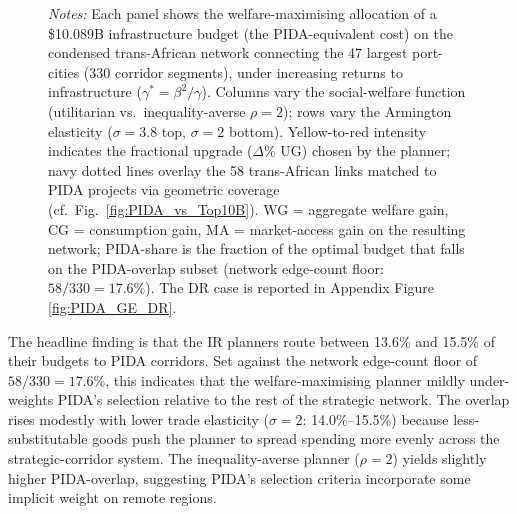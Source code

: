 \documentclass[a4paper]{article}
\begin{document}
\begin{figure}[h!]
\emph{Notes:} Each panel shows the welfare-maximising allocation of a \$10.089B infrastructure budget (the PIDA-equivalent cost) on the condensed trans-African network connecting the 47 largest port-cities (330 corridor segments), under increasing returns to infrastructure ($\gamma^\ast = \beta^2/\gamma$). Columns vary the social-welfare function (utilitarian vs.\ inequality-averse $\rho = 2$); rows vary the Armington elasticity ($\sigma = 3.8$ top, $\sigma = 2$ bottom). Yellow-to-red intensity indicates the fractional upgrade ($\Delta\%$ UG) chosen by the planner; navy dotted lines overlay the 58 trans-African links matched to PIDA projects via geometric coverage (cf.\ Fig.\ \ref{fig:PIDA_vs_Top10B}). WG = aggregate welfare gain, CG = consumption gain, MA = market-access gain on the resulting network; PIDA-share is the fraction of the optimal budget that falls on the PIDA-overlap subset (network edge-count floor: $58/330 = 17.6\%$). %
The DR case is reported in Appendix Figure \ref{fig:PIDA_GE_DR}. \vspace{-5mm}
\end{figure}

The headline finding is that the IR planners route between 13.6\% and 15.5\% of their budgets to PIDA corridors. Set against the network edge-count floor of $58/330 = 17.6\%$, this indicates that the welfare-maximising planner mildly under-weights PIDA's selection relative to the rest of the strategic network. 
The overlap rises modestly with lower trade elasticity ($\sigma = 2$: 14.0\%--15.5\%) because less-substitutable goods push the planner to spread spending more evenly across the strategic-corridor system. The inequality-averse planner ($\rho = 2$) yields slightly higher PIDA-overlap, suggesting PIDA's selection criteria incorporate some implicit weight on remote regions. \newline
\end{document}
